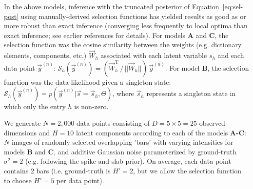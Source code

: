 In the above models, inference with the truncated posterior of Equation~\eqref{eq:sel-post} using manually-derived selection functions has yielded results as good as or more robust than exact inference (converging less frequently to local optima than exact inference; see earlier references for details).
For models \textbf{A} and \textbf{C}, the selection function was the cosine similarity between the weights (e.g. dictionary elements, components, etc.) $\vec{W}_h$ associated with each latent variable $s_h$ and 
each data point $\vec{y}^{(n)}$: 
$  \mathcal{S}_h(\vec{y}^{(n)}) = (\vec{W}_{h}^{\mathrm{T}}\,/\,||\vec{W}_{h}||)\,\vec{y}^{(n)}$.
For model \textbf{B}, the  selection function was the data likelihood given a singleton state:
 $\mathcal{S}_h(\vec{y}^{(n)}) = p(\vec{y}^{(n)} | \vec{s}=\vec{s}_h, \Theta)$, 
%
where $\vec{s}_h$ represents a singleton state in which only the entry $h$ is non-zero.

We generate $N=2,000$ data points consisting of $D=5\times5=25$ observed dimensions and $H=10$ latent components according to each of the models \textbf{A-C}:
$N$ images of randomly selected overlapping 'bars' with varying intensities for models \textbf{B} and \textbf{C}, and additive Gaussian noise parameterized by ground-truth $\sigma^2 = 2$ (e.g. following the spike-and-slab prior).
On average, each data point contains $2$ bars (i.e. ground-truth is $H'=2$, but we allow the selection function to choose $H'=5$ per data point).

